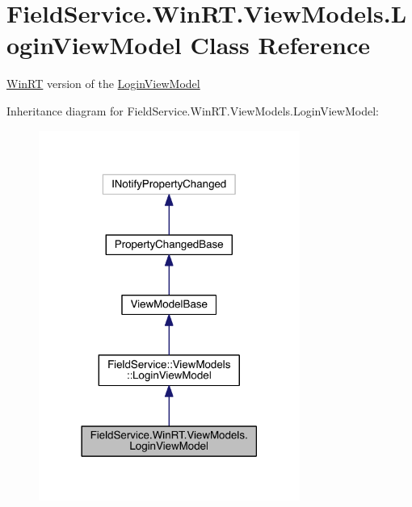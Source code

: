 \hypertarget{class_field_service_1_1_win_r_t_1_1_view_models_1_1_login_view_model}{\section{Field\+Service.\+Win\+R\+T.\+View\+Models.\+Login\+View\+Model Class Reference}
\label{class_field_service_1_1_win_r_t_1_1_view_models_1_1_login_view_model}
}


\hyperlink{namespace_field_service_1_1_win_r_t}{Win\+R\+T} version of the \hyperlink{class_field_service_1_1_win_r_t_1_1_view_models_1_1_login_view_model}{Login\+View\+Model}  




Inheritance diagram for Field\+Service.\+Win\+R\+T.\+View\+Models.\+Login\+View\+Model\+:
\nopagebreak
\begin{figure}[H]
\begin{center}
\leavevmode
\includegraphics[width=242pt]{class_field_service_1_1_win_r_t_1_1_view_models_1_1_login_view_model__inherit__graph}
\end{center}
\end{figure}


